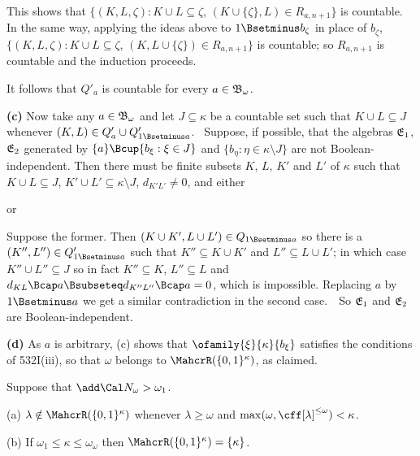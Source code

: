 {This shows that
$\{(K,L,\zeta):K\cup L\subseteq\zeta$,
$(K\cup\{\zeta\},L)\in R_{a,n+1}\}$ is countable.    In the same way,
applying the ideas above to
$1\Bsetminus b_{\zeta}$ in place of $b_{\zeta}$,
$\{(K,L,\zeta):K\cup L\subseteq\zeta$,
$(K,L\cup\{\zeta\})\in R_{a,n+1}\}$ is countable;  so $R_{a,n+1}$ is
countable and the induction proceeds.\ \Qed

It follows that $Q'_a$ is countable for every $a\in\frak B_{\omega}$.

\medskip

{\bf (c)} Now take any $a\in\frak B_{\omega}$ and let
$J\subseteq\kappa$ be a countable set such that $K\cup L\subseteq J$
whenever $(K,L)\in Q'_a\cup Q'_{1\Bsetminus a}$.   \Quer\ Suppose, if
possible, that the algebras $\frak E_1$, $\frak E_2$ generated by
$\{a\}\Bcup\{b_{\xi}:\xi\in J\}$ and
$\{b_{\eta}:\eta\in\kappa\setminus J\}$ are not Boolean-independent.
Then there must be finite subsets $K$, $L$, $K'$ and $L'$ of $\kappa$
such that $K\cup L\subseteq J$,
$K'\cup L'\subseteq\kappa\setminus J$, $d_{K'L'}\ne 0$, and either


\noindent or


\noindent Suppose the former.   Then
$(K\cup K',L\cup L')\in Q_{1\Bsetminus a}$ so there is a
$(K'',L'')\in Q'_{1\Bsetminus a}$ such that $K''\subseteq K\cup K'$ and
$L''\subseteq L\cup L'$;  in which case $K''\cup L''\subseteq J$ so in
fact $K''\subseteq K$, $L''\subseteq L$ and
$d_{KL}\Bcap a\Bsubseteq d_{K''L''}\Bcap a=0$, which is impossible.
Replacing $a$ by $1\Bsetminus a$ we get a similar contradiction in the
second case.\ \BanG\  So $\frak E_1$ and $\frak E_2$ are
Boolean-independent.

\medskip

{\bf (d)} As $a$ is arbitrary, (c) shows that
$\ofamily{\xi}{\kappa}{b_{\xi}}$ satisfies the conditions of 532I(iii),
so that $\omega$ belongs to $\MahcrR(\{0,1\}^{\kappa})$, as claimed.
}%

 Suppose that $\add\Cal N_{\omega}>\omega_1$.

(a) $\lambda\notin\MahcrR(\{0,1\}^{\kappa})$ whenever $\lambda\ge\omega$
and $\max(\omega,\cff[\lambda]^{\le\omega})<\kappa$.

(b) If $\omega_1\le\kappa\le\omega_{\omega}$ then
$\MahcrR(\{0,1\}^{\kappa})=\{\kappa\}$.

